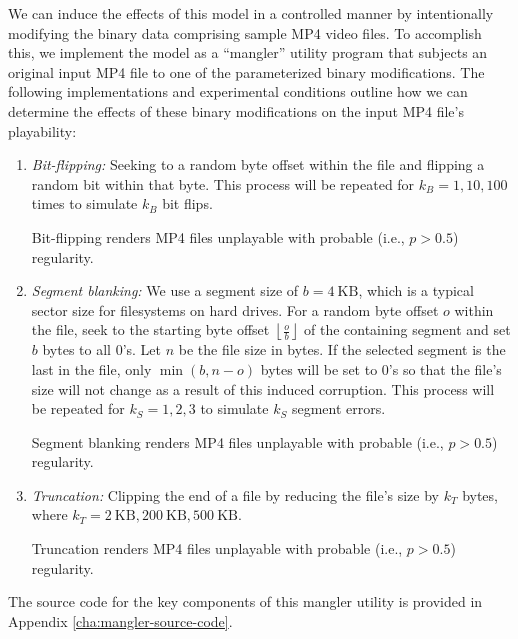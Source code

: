 We can induce the effects of this model in a controlled manner by intentionally modifying the binary data comprising sample MP4 video files. To accomplish this, we implement the model as a ``mangler'' utility program that subjects an original input MP4 file to one of the parameterized binary modifications. The following implementations and experimental conditions outline how we can determine the effects of these binary modifications on the input MP4 file's playability:
\begin{enumerate}
	\item \emph{Bit-flipping:} Seeking to a random byte offset within the file and flipping a random bit within that byte. This process will be repeated for \( k_B = 1, 10, 100 \) times to simulate \( k_B \) bit flips.
    \begin{hypothesis}
        \label{hyp:bit-flipping}
        Bit-flipping renders MP4 files unplayable with probable (i.e., \( p > 0.5 \)) regularity.
    \end{hypothesis}
    \item \emph{Segment blanking:} We use a segment size of \( b = 4\ \text{KB} \), which is a typical sector size for filesystems on hard drives. For a random byte offset \( o \) within the file, seek to the starting byte offset \( \left\lfloor \frac{o}{b} \right\rfloor \) of the containing segment and set \( b \) bytes to all 0's. Let \( n \) be the file size in bytes. If the selected segment is the last in the file, only \( \min \left( b, n - o \right) \) bytes will be set to 0's so that the file's size will not change as a result of this induced corruption. This process will be repeated for \( k_S = 1, 2, 3 \) to simulate \( k_S \) segment errors.
    \begin{hypothesis}
        \label{hyp:blanking}
        Segment blanking renders MP4 files unplayable with probable (i.e., \( p > 0.5 \)) regularity.
    \end{hypothesis}
	\item \emph{Truncation:} Clipping the end of a file by reducing the file's size by \( k_T \) bytes, where \( k_T = 2\ \text{KB}, 200\ \text{KB}, 500\ \text{KB} \).
    \begin{hypothesis}
        \label{hyp:truncation}
        Truncation renders MP4 files unplayable with probable (i.e., \( p > 0.5 \)) regularity.
    \end{hypothesis}
\end{enumerate}
The source code for the key components of this mangler utility is provided in Appendix \ref{cha:mangler-source-code}.

